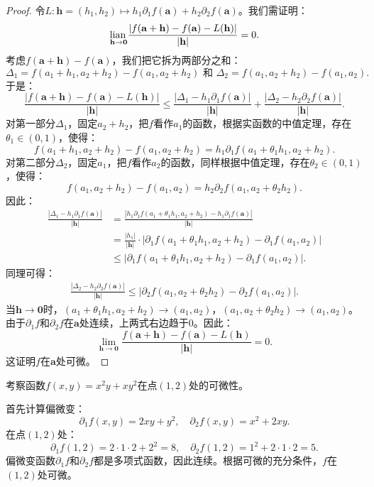 \documentclass[12pt,UTF8]{ctexbook}
\begin{document}
\begin{appendix}
\begin{proof}    
令$L:\mathbf{h} = (h_1,h_2) \mapsto h_1\partial_1 f(\mathbf{a}) + h_2\partial_2 f(\mathbf{a})$。我们需证明：
$$ \underset{\mathbf{h}\to\mathbf{0}}{\operatorname{lian}\,} \frac{|f(\mathbf{a}+\mathbf{h}) - f(\mathbf{a}) - L(\mathbf{h})|}{|\mathbf{h}|} = 0. $$
考虑$f(\mathbf{a}+\mathbf{h}) - f(\mathbf{a})$，我们把它拆为两部分之和：
$$ \Delta_1 = f(a_1+h_1,a_2+h_2) - f(a_1,a_2+h_2) \,\, \mbox{和}\,\,\Delta_2 = f(a_1,a_2+h_2) - f(a_1,a_2). $$
于是：
$$ \frac{|f(\mathbf{a}+\mathbf{h}) - f(\mathbf{a}) - L(\mathbf{h})|}{|\mathbf{h}|} \leqslant \frac{|\Delta_1 - h_1\partial_1 f(\mathbf{a})|}{|\mathbf{h}|} + \frac{|\Delta_2 - h_2\partial_2 f(\mathbf{a})|}{|\mathbf{h}|}.  $$
对第一部分$\Delta_1$，固定$a_2+h_2$，把$f$看作$a_1$的函数，根据实函数的中值定理，存在$\theta_1\in(0,1)$，使得：
$$ f(a_1+h_1,a_2+h_2) - f(a_1,a_2+h_2) = h_1\partial_1 f(a_1+\theta_1 h_1,a_2+h_2). $$
对第二部分$\Delta_2$，固定$a_1$，把$f$看作$a_2$的函数，同样根据中值定理，存在$\theta_2\in(0,1)$，使得：
$$ f(a_1,a_2+h_2) - f(a_1,a_2) = h_2\partial_2 f(a_1,a_2+\theta_2 h_2). $$
因此：
\begin{align*}
\frac{|\Delta_1 - h_1\partial_1 f(\mathbf{a})|}{|\mathbf{h}|} &= \frac{|h_1\partial_1 f(a_1+\theta_1 h_1,a_2+h_2) - h_1\partial_1 f(\mathbf{a})|}{|\mathbf{h}|} \\
&= \frac{|h_1|}{|\mathbf{h}|}\cdot|\partial_1 f(a_1+\theta_1 h_1,a_2+h_2) - \partial_1 f(a_1,a_2)| \\
&\leqslant |\partial_1 f(a_1+\theta_1 h_1,a_2+h_2) - \partial_1 f(a_1,a_2)|.
\end{align*}
同理可得：
\begin{align*}
    \frac{|\Delta_2 - h_2\partial_2 f(\mathbf{a})|}{|\mathbf{h}|} \leqslant |\partial_2 f(a_1,a_2+\theta_2 h_2) - \partial_2 f(a_1,a_2)|.
\end{align*}
当$\mathbf{h}\to\mathbf{0}$时，$(a_1+\theta_1 h_1,a_2+h_2)\to(a_1,a_2)$，$(a_1,a_2+\theta_2 h_2)\to(a_1,a_2)$。由于$\partial_1 f$和$\partial_2 f$在$\mathbf{a}$处连续，上两式右边趋于$0$。因此：
$$ \lim_{\mathbf{h}\to\mathbf{0}} \frac{f(\mathbf{a}+\mathbf{h}) - f(\mathbf{a}) - L(\mathbf{h})}{|\mathbf{h}|} = 0. $$
这证明$f$在$\mathbf{a}$处可微。
\end{proof}

\begin{et}
考察函数$f(x,y) = x^2y + xy^2$在点$(1,2)$处的可微性。
\end{et}

\begin{so}
首先计算偏微变：
$$ \partial_1 f(x,y) = 2xy + y^2, \quad \partial_2 f(x,y) = x^2 + 2xy. $$
在点$(1,2)$处：
$$ \partial_1 f(1,2) = 2\cdot1\cdot2 + 2^2 = 8, \quad \partial_2 f(1,2) = 1^2 + 2\cdot1\cdot2 = 5. $$
偏微变函数$\partial_1 f$和$\partial_2 f$都是多项式函数，因此连续。根据可微的充分条件，$f$在$(1,2)$处可微。


\end{so}
\end{appendix}
\end{document}
